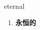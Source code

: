 
\begin{frame}
{\huge eternal}
\begin{center}
\begin{enumerate}\Large
  \item \textbf{永恒的}
\end{enumerate}
\end{center}
\end{frame}
